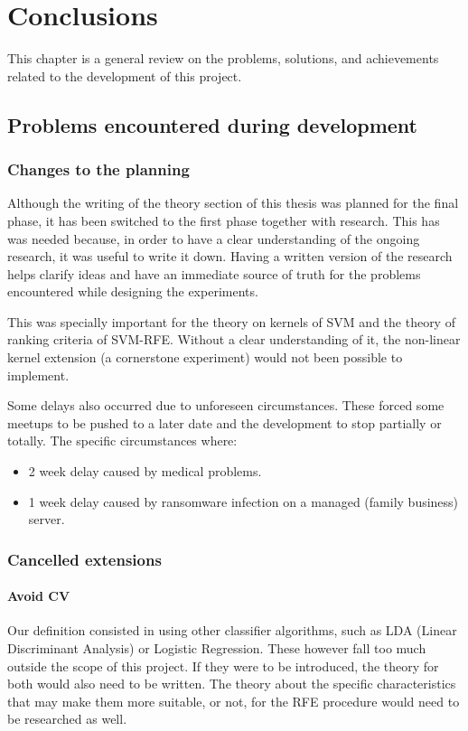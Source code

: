 
\chapter{Conclusions} %

This chapter is a general review on the problems, solutions, and achievements related to the development of this project. 

\section{Problems encountered during development}

\subsection{Changes to the planning}

Although the writing of the theory section of this thesis was planned for the final phase, it has been switched to the first phase together with research. This has was needed because, in order to have a clear understanding of the ongoing research, it was useful to write it down. Having a written version of the research helps clarify ideas and have an immediate source of truth for the problems encountered while designing the experiments.

This was specially important for the theory on kernels of SVM and the theory of ranking criteria of SVM-RFE. Without a clear understanding of it, the non-linear kernel extension (a cornerstone experiment) would not been possible to implement.

Some delays also occurred due to unforeseen circumstances. These forced some meetups to be pushed to a later date and the development to stop partially or totally. The specific circumstances where:

\begin{itemize}
    \item 2 week delay caused by medical problems.
    \item 1 week delay caused by ransomware infection on a managed (family business) server. 
\end{itemize}

\subsection{Cancelled extensions}

\subsubsection*{Avoid CV}
Our definition consisted in using other classifier algorithms, such as LDA (Linear Discriminant Analysis) or Logistic Regression. These however fall too much outside the scope of this project. If they were to be introduced, the theory for both would also need to be written. The theory about the specific characteristics that may make them more suitable, or not, for the RFE procedure would need to be researched as well.

